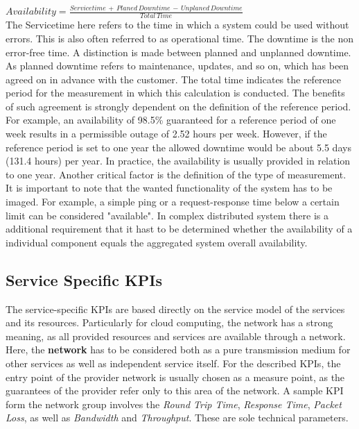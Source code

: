   $ Availability =  \frac{Servicetime \,+ \,Planed\, Downtime\, - \,Unplaned \, Downtime}{Total  \, Time}$\\
 
 The Servicetime here refers to the time in which a system could be used without errors. This is also often referred to as operational time. The downtime is the non  error-free  time. A distinction is made between planned and unplanned downtime. As planned downtime refers to maintenance, updates, and so on, which has been agreed on in advance with the customer. The total time indicates the reference period for the measurement in which this calculation is conducted.  The benefits of such agreement is strongly dependent on the definition of the reference period. For example, an availability of 98.5\% guaranteed for a reference period of one week results in a permissible outage of 2.52 hours per week. However, if the reference period is set to one year the allowed downtime would be about 5.5 days (131.4 hours) per year. In practice, the availability is usually provided in relation to one year.  Another critical factor is the definition of the type of measurement. It is important to note that the wanted functionality of the system has to be imaged. For example, a simple ping or a request-response time below a certain limit can be considered "available".  In complex distributed system there is a additional requirement that it hast to be determined whether the availability of a individual component equals the aggregated system overall availability.
 
\subsection{Service Specific KPIs } 
The service-specific KPIs are based directly on the service model of the services and its resources. Particularly for cloud computing, the network has a strong meaning, as all provided resources and services are available through a network. Here, the \textbf{network} has to be considered both as a pure transmission medium for other services as well as independent service itself. For the described KPIs, the entry point of the provider network is usually chosen as a  measure point, as the guarantees of the provider refer only to this area of the network. A sample KPI form the network group involves the \emph{Round Trip Time}, \emph{Response Time}, \emph{Packet Loss}, as well as \emph{Bandwidth} and \emph{Throughput}. These are sole technical parameters.


